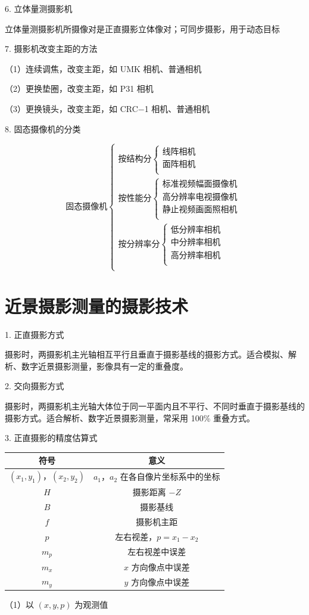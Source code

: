 \documentclass[a4paper]{ctexart}
\begin{document}
6. 立体量测摄影机

立体量测摄影机所摄像对是正直摄影立体像对；可同步摄影，用于动态目标

7. 摄影机改变主距的方法

（1）连续调焦，改变主距，如 UMK 相机、普通相机

（2）更换垫圈，改变主距，如 P31 相机

（3）更换镜头，改变主距，如 CRC$-$1 相机、普通相机

8. 固态摄像机的分类

$$
\text{固态摄像机}\begin{cases}
	\text{按结构分}\begin{cases}
	\text{线阵相机}\\
	\text{面阵相机}\\
\end{cases}\\
	\text{按性能分}\begin{cases}
	\text{标准视频幅面摄像机}\\
	\text{高分辨率电视摄像机}\\
	\text{静止视频画面照相机}\\
\end{cases}\\
	\text{按分辨率分}\begin{cases}
	\text{低分辨率相机}\\
	\text{中分辨率相机}\\
	\text{高分辨率相机}\\
\end{cases}\\
\end{cases}
$$
\newpage
\section{近景摄影测量的摄影技术}
1. 正直摄影方式

摄影时，两摄影机主光轴相互平行且垂直于摄影基线的摄影方式。适合模拟、解析、数字近景摄影测量，影像具有一定的重叠度。

2. 交向摄影方式

摄影时，两摄影机主光轴大体位于同一平面内且不平行、不同时垂直于摄影基线的摄影方式。适合解析、数字近景摄影测量，常采用 100\% 重叠方式。

3. 正直摄影的精度估算式

\begin{table}[h]
\centering
\begin{tabular}{cc}
\toprule
符号 &意义  \\
\midrule
$(x_1,y_1)$，$(x_2,y_2)$ &$a_1$，$a_2$ 在各自像片坐标系中的坐标  \\
$H$ &摄影距离 $-Z$  \\
$B$ &摄影基线  \\
$f$ &摄影机主距  \\
$p$ &左右视差，$p=x_1-x_2$  \\
$m_p$ &左右视差中误差  \\
$m_x$ &$x$ 方向像点中误差 \\
$m_y$&$y$ 方向像点中误差\\
\bottomrule
\end{tabular}
\end{table}
（1）以 $(x,y,p)$ 为观测值
\end{document}
